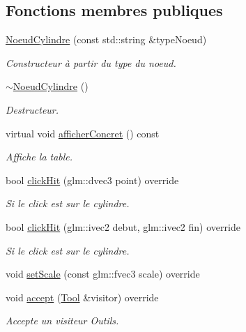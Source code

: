 \subsection*{Fonctions membres publiques}
{\bf }\par
\begin{DoxyCompactItemize}
\item 
\hyperlink{class_noeud_cylindre_aee7f35b6d758ac40b96daadf526f4504}{Noeud\-Cylindre} (const std\-::string \&type\-Noeud)
\begin{DoxyCompactList}\small\item\em Constructeur à partir du type du noeud. \end{DoxyCompactList}\item 
\hyperlink{class_noeud_cylindre_aa08fe15b1f926c8d651fcd467d3cb36a}{$\sim$\-Noeud\-Cylindre} ()
\begin{DoxyCompactList}\small\item\em Destructeur. \end{DoxyCompactList}\item 
virtual void \hyperlink{class_noeud_cylindre_a24bd5b287091cdecdd250ebb83594551}{afficher\-Concret} () const 
\begin{DoxyCompactList}\small\item\em Affiche la table. \end{DoxyCompactList}\item 
bool \hyperlink{class_noeud_cylindre_a524d454765b791a68d42e10254e58885}{click\-Hit} (glm\-::dvec3 point) override
\begin{DoxyCompactList}\small\item\em Si le click est sur le cylindre. \end{DoxyCompactList}\item 
bool \hyperlink{class_noeud_cylindre_a461dfbf53728711e290d14db7464f5f9}{click\-Hit} (glm\-::ivec2 debut, glm\-::ivec2 fin) override
\begin{DoxyCompactList}\small\item\em Si le click est sur le cylindre. \end{DoxyCompactList}\item 
void \hyperlink{class_noeud_cylindre_a37f3266147e98c0dd312ac674d88e9b4}{set\-Scale} (const glm\-::fvec3 scale) override
\item 
void \hyperlink{class_noeud_cylindre_a108b067e7817f5c83ca66643bb67769b}{accept} (\hyperlink{class_tool}{Tool} \&visitor) override
\begin{DoxyCompactList}\small\item\em Accepte un visiteur Outils. \end{DoxyCompactList}\end{DoxyCompactItemize}

